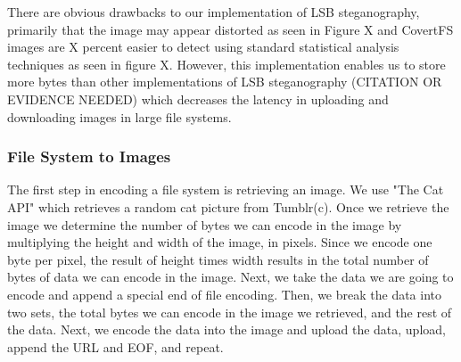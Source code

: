 There are obvious drawbacks to our implementation of LSB steganography, primarily that the image may appear distorted as seen in Figure X and CovertFS images are X percent easier to detect using standard statistical analysis techniques as seen in figure X. However, this implementation enables us to store more bytes than other implementations of LSB steganography (CITATION OR EVIDENCE NEEDED) which decreases the latency in uploading and downloading images in large file systems.
 
\subsubsection{File System to Images}

The first step in encoding a file system is retrieving an image. We use "The Cat API" which retrieves a random cat picture from Tumblr(c). Once we retrieve the image we determine the number of bytes we can encode in the image by multiplying the height and width of the image, in pixels. Since we encode one byte per pixel, the result of height times width results in the total number of bytes of data we can encode in the image. Next, we take the data we are going to encode and append a special end of file encoding. Then, we break the data into two sets, the total bytes we can encode in the image we retrieved, and the rest of the data. Next, we encode the data into the image and upload the data, upload, append the URL and EOF, and repeat. 


